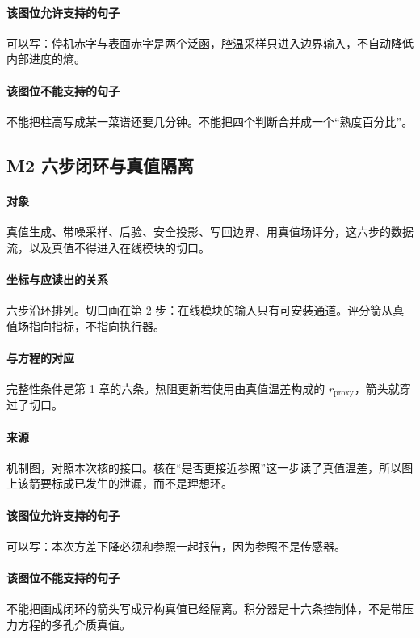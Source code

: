 \paragraph{该图位允许支持的句子}
可以写：停机赤字与表面赤字是两个泛函，腔温采样只进入边界输入，不自动降低内部进度的熵。

\paragraph{该图位不能支持的句子}
不能把柱高写成某一菜谱还要几分钟。不能把四个判断合并成一个“熟度百分比”。

\subsection{M2 六步闭环与真值隔离}
\paragraph{对象}
真值生成、带噪采样、后验、安全投影、写回边界、用真值场评分，这六步的数据流，以及真值不得进入在线模块的切口。

\paragraph{坐标与应读出的关系}
六步沿环排列。切口画在第 2 步：在线模块的输入只有可安装通道。评分箭从真值场指向指标，不指向执行器。

\paragraph{与方程的对应}
完整性条件是第 1 章的六条。热阻更新若使用由真值温差构成的 $r_{\mathrm{proxy}}$，箭头就穿过了切口。

\paragraph{来源}
机制图，对照本次核的接口。核在“是否更接近参照”这一步读了真值温差，所以图上该箭要标成已发生的泄漏，而不是理想环。

\paragraph{该图位允许支持的句子}
可以写：本次方差下降必须和参照一起报告，因为参照不是传感器。

\paragraph{该图位不能支持的句子}
不能把画成闭环的箭头写成异构真值已经隔离。积分器是十六条控制体，不是带压力方程的多孔介质真值。

